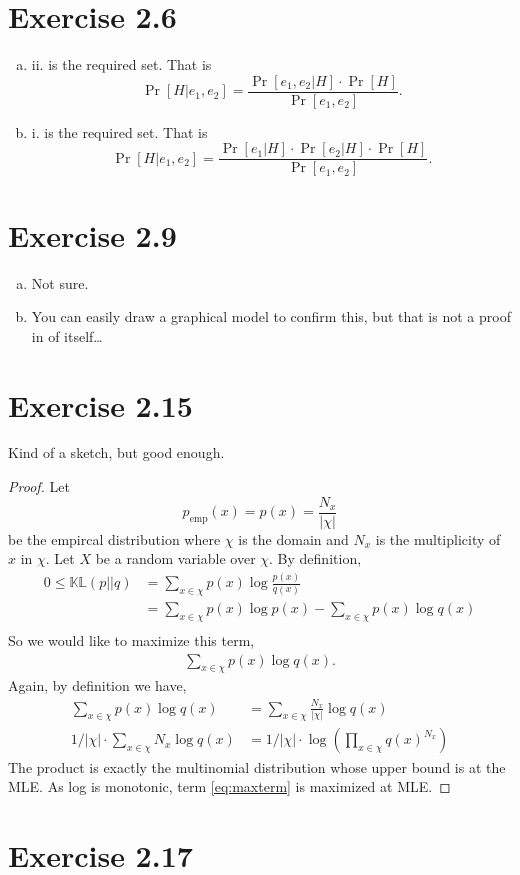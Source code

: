 \documentclass[12pt]{article}
\newcommand{\bayes}[2]{\frac{\Pr[#2|#1] \cdot \Pr[#1]}{\Pr[#2]}}
\newcommand{\KL}[2]{\mathbb{KL}(#1||#2)}
\begin{document}
\section*{Exercise 2.6}
\begin{enumerate}[a)]
    \item ii. is the required set. That is \[\Pr[H|e_1, e_2] = \bayes{H}{e_1, e_2}.\]
    \item i. is the required set. That is
        \[\Pr[H|e_1, e_2] = \frac{\Pr[e_1|H] \cdot \Pr[e_2|H] \cdot \Pr[H]}{\Pr[e_1, e_2]}.\]
\end{enumerate}
\section*{Exercise 2.9}
\begin{enumerate}[a)]
    \item Not sure.
    \item You can easily draw a graphical model to confirm this, but that is
        not a proof in of itself\dots
\end{enumerate}
\section*{Exercise 2.15}
Kind of a sketch, but good enough.
\begin{proof}
    Let \[p_{\text{emp}}(x) = p(x) = \frac{N_x}{|\chi|}\] be the empircal
    distribution where $\chi$ is the domain and $N_x$ is the multiplicity of
    $x$ in $\chi$. Let $X$ be a random variable over $\chi$. By definition,
    \begin{align*}
        0 \leq \KL{p}{q} &= \sum_{x \in \chi} p(x) \log \frac{p(x)}{q(x)}\\
        &= \sum_{x \in \chi} p(x) \log p(x) - \sum_{x \in \chi} p(x) \log q(x)\\
    \end{align*}
    So we would like to maximize this term,
    \begin{align}
        \label{eq:maxterm}
        \sum_{x \in \chi} p(x) \log q(x).
    \end{align}
    Again, by definition we have,
    \begin{align*}
    \sum_{x \in \chi} p(x) \log q(x) &= \sum_{x \in \chi} \frac{N_x}{|\chi|} \log q(x)\\
    1/|\chi| \cdot \sum_{x \in \chi} N_x \log q(x) &= 1/|\chi| \cdot \log \left(
        \prod_{x \in \chi} q(x)^{N_x} \right)
    \end{align*}
    The product is exactly the multinomial distribution whose upper bound is at
    the MLE. As log is monotonic, term \ref{eq:maxterm} is maximized at MLE.
\end{proof}

\section*{Exercise 2.17}
\end{document}
